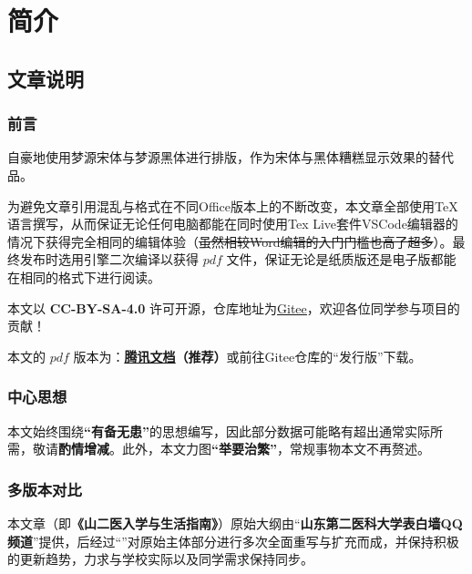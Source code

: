 \chapter[简介]{简介\vspace{-2em}}
\section[文章说明]{文章说明}
\vspace{-1em}
\subsection[前言]{前言}
\vspace{-1em}
自豪地使用梦源宋体与梦源黑体进行排版，作为宋体与黑体糟糕显示效果的替代品。

为避免文章引用混乱与格式在不同Office版本上的不断改变，本文章全部使用\TeX 语言撰写，从而保证无论任何电脑都能在同时使用Tex Live套件VSCode编辑器\footnotemark 的情况下获得完全相同的编辑体验（\sout{虽然相较Word编辑的入门门槛也高了超多}）。最终发布时选用\XeLaTeX 引擎二次编译以获得 $pdf$ 文件，保证无论是纸质版还是电子版都能在相同的格式下进行阅读。

本文以 \textbf{CC-BY-SA-4.0} 许可开源，仓库地址为\uline{\href{https://gitee.com/mikazo/guide_for_freshman}{Gitee}}，欢迎各位同学参与项目的贡献！

本文的 $pdf$ 版本\textbf{}为：\textbf{\uline{\href{https://docs.qq.com/s/ETcQ-ZFSrSsh6MK9bm773q}{腾讯文档}}（推荐）}或前往Gitee仓库的“发行版”下载。

\subsection[中心思想]{中心思想}
\vspace{-1em}
本文始终围绕\textbf{“有备无患”}的思想编写，因此部分数据可能略有超出通常实际所需，敬请\textbf{酌情增减}。此外，本文力图\textbf{“举要治繁”}，常规事物本文不再赘述。

\subsection[多版本对比]{多版本对比}
\vspace{-1em}
本文章（即\textbf{《山二医入学与生活指南》}）原始大纲由“\textbf{山东第二医科大学表白墙QQ频道}”提供，后经过“\textbf{}”对原始主体部分进行多次全面重写与扩充而成，并保持积极的更新趋势，力求与学校实际以及同学需求保持同步。

